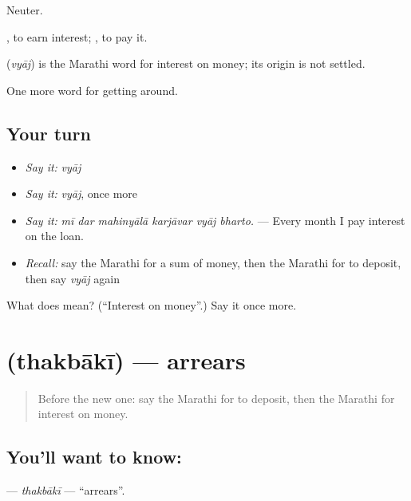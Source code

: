 Neuter.

 , to earn interest;  , to pay it.

\begin{cousinweb}
\textbf{} (\emph{vyāj}) is the Marathi word for interest on money; its origin is not settled.
\end{cousinweb}

\begin{grammarlens}[title={What you've built}]
One more word for getting around.
\end{grammarlens}

\subsection*{Your turn}
\begin{itemize}
\raggedright
  \item \emph{Say it:} \emph{vyāj}
  \item \emph{Say it:} \emph{vyāj}, once more
  \item \emph{Say it:} \emph{mī dar mahinyālā karjāvar vyāj bharto.} — Every month I pay interest on the loan.
  \item \emph{Recall:} say the Marathi for a sum of money, then the Marathi for to deposit, then say \emph{vyāj} again
\end{itemize}

\begin{tcolorbox}[breakable,colback=teal!4,colframe=teal!35!black,title={Before you move on}]
What does  mean? (\textquotedblleft{}Interest on money\textquotedblright{}.) Say it once more.
\end{tcolorbox}
\section[\texorpdfstring{\mr{थकबाकी} (thakbākī)}{थकबाकी (thakbākī)}]{ (thakbākī) — arrears}

\label{lesson:MR-C427-thakbaki}



\begin{quote}
Before the new one: say the Marathi for to deposit, then the Marathi for interest on money.
\end{quote}

\subsection*{You'll want to know: }
\textbf{} — \emph{thakbākī} — \textquotedblleft{}arrears\textquotedblright{}.

